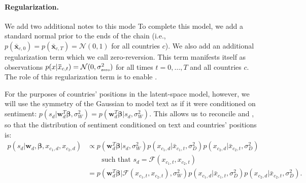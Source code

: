 \paragraph{Regularization.} We add two additional notes to this mode
To complete this model, we add a standard normal prior to the ends of
the chain (i.e., $p(\bm \bar x_{c, 0}) = p(\bm \bar x_{c,T}) =
\mathcal{N}(0, 1)$ for all countries $c$).  We also add an additional
regularization term which we call zero-reversion.  This term manifests
itself as observations $p(x | \bm \bar x_{c, t}) = \mathcal{N}(0,
\sigma_{\mbox{\tiny zero}}^2)$ for all times $t = 0, \ldots, T$ and
all countries $c$.  The role of this regularization term is to enable .

For the purposes of countries' positions in the latent-space model,
however, we will use the symmetry of the Gaussian to model text as if
it were conditioned on sentiment: $p(s_d | \bm w_d^T \bm \beta,
\sigma_W^2) = p( \bm w_d^T \bm \beta | s_d, \sigma_W^2 )$.  This
allows us to reconcile  and
, so that the distribution of sentiment
conditioned on text and countries' positions is:
\begin{align}
  p(s_d | \bm w_d, \bm \beta, x_{c_1,d}, x_{c_2,d}) & \propto
  p(\bm w_d^T \bm \beta | s_d, \sigma_W^2 )
  p(x_{c_1,d} | \bar x_{c_1, t}, \sigma_D^2)
  p(x_{c_2,d} | \bar x_{c_2, t}, \sigma_D^2) \nonumber \\
  & \hspace{20pt} \mbox{ such that } s_d = \mathcal{F}(x_{c_1,t},
  x_{c_2,t}) \nonumber \\
  & = 
  p(\bm w_d^T \bm \beta |
    \mathcal{F}(x_{c_1,t}, x_{c_2,t}), \sigma_W^2 )
  p(x_{c_1,d} | \bar x_{c_1, t}, \sigma_D^2)
  p(x_{c_2,d} | \bar x_{c_2, t}, \sigma_D^2).
\end{align}



